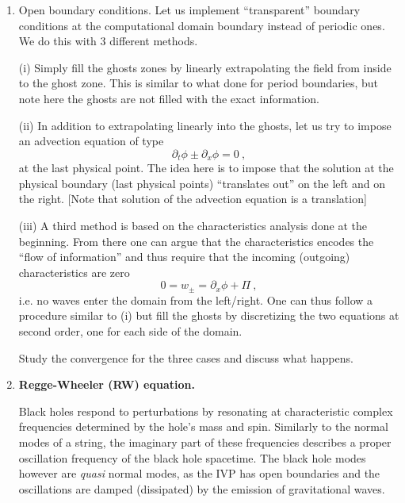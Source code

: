 \begin{enumerate}
  {\bf SB: Here we could add the von-Neumann stability analysis as
    analytical exercise.}

\item Open boundary conditions. Let us implement ``transparent''
  boundary conditions at the computational domain boundary instead of
  periodic ones. We do this with 3 different methods.

  (i) Simply fill the ghosts zones by linearly extrapolating the field
  from inside to the ghost zone. This is similar to what done for
  period boundaries, but note here the ghosts are not filled with the exact 
  information.
  
  (ii) In addition to extrapolating linearly into the ghosts, let us
  try to impose an advection equation of type 
  \begin{equation}
    \partial_{t} \phi \pm \partial_{x} \phi = 0 \ ,
  \end{equation}
  at the last physical point. The idea here is to impose that the
  solution at the physical boundary (last physical points)
  ``translates out'' on the left and on the right. [Note that solution
    of the advection equation is a translation]
  
  (iii) A third method is based on the characteristics analysis done
  at the beginning. From there one can argue that the
  characteristics encodes the ``flow of information'' and thus require
  that the incoming (outgoing) characteristics are zero 
  \begin{equation}
    0 = w_\pm = \partial_x \phi + \Pi \ , 
  \end{equation}
  i.e. no waves enter the domain from the left/right.
  One can thus follow a procedure similar to (i) but fill the ghosts
  by discretizing the two equations at second order, one for each side of the domain. 

  Study the convergence for the three cases and discuss what happens.


\item {\bf Regge-Wheeler (RW) equation.} 

Black holes respond to perturbations by resonating at characteristic complex frequencies determined by the hole's mass and spin.
Similarly to the normal modes of a string, the imaginary part of these frequencies describes a proper oscillation frequency of the black hole spacetime.
The black hole modes however are {\it quasi} normal modes, as the IVP
has open boundaries and the oscillations are damped (dissipated) by
the emission of gravitational waves. 


\end{enumerate}
